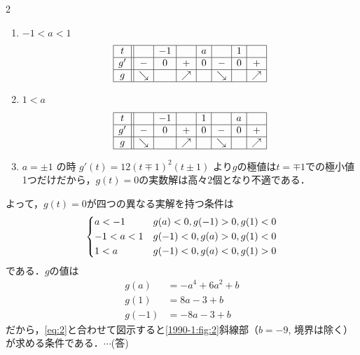 \documentclass[../../main.tex]{subfiles}
\begin{document}
\begin{multicols}{2}
\begin{enumerate}
    \item $-1 < a < 1$
      \begin{align}
        \begin{array}{|c||c|c|c|c|c|c|c|}
          \hline
          t  &          & -1 &          & a &          & 1 &          \\
          \hline
          g' & -        & 0  & +        & 0 & -        & 0 & +        \\
          \hline
          g  & \searrow &    & \nearrow &   & \searrow &   & \nearrow \\
          \hline
        \end{array}
      \end{align}

    \item $1 < a$
      \begin{align}
        \begin{array}{|c||c|c|c|c|c|c|c|}
          \hline
          t  &          & -1 &          & 1 &          & a &          \\
          \hline
          g' & -        & 0  & +        & 0 & -        & 0 & +        \\
          \hline
          g  & \searrow &    & \nearrow &   & \searrow &   & \nearrow \\
          \hline
        \end{array}
      \end{align}

    \item $a=\pm 1$ の時
      $g'(t)=12(t\mp1)^2(t\pm1)$ より$g$の極値は$t=\mp1$での極小値1つだけだから，$g(t)=0$の実数解は高々$2$個となり不適である．
  \end{enumerate}

  よって，$g(t)=0$が四つの異なる実解を持つ条件は
  \begin{align}
    \begin{dcases}
      a < -1     & g(a)<0, g(-1)>0, g(1)<0 \\
      -1 < a < 1 & g(-1)<0, g(a)>0, g(1)<0 \\
      1 < a      & g(-1)<0, g(a)<0, g(1)>0
    \end{dcases}
  \end{align}
  である．$g$の値は
  \begin{align}
    g(a)  & = -a^4 + 6a^2 + b \\
    g(1)  & = 8a-3+b          \\
    g(-1) & = -8a-3+b
  \end{align}
  だから，\cref{eq:2}と合わせて図示すると\cref{1990-1:fig:2}斜線部（$b=-9$, 境界は除く）が求める条件である．$\cdots$(答)


\end{multicols}
\end{document}
